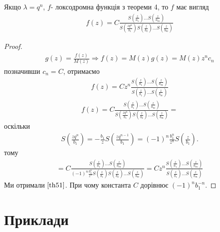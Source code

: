 \documentclass[12pt,a4paper]{article}
\begin{document}
\vspace{1,5cm}

\begin{thm}
Якщо $\lambda =q^{n}$, $f$- локсодромна функція з теореми 4, то  $f$ має вигляд
\begin{equation}\label{th51}
\begin{array}{l}
 f(z)= C\tfrac{S(\frac{z}{a_{1}})...S(\frac{z}{a_{m}})}{S(\frac{zq^{n}}{b_{1}})S(\frac{z}{b_{2}})...S(\frac{z}{b_{m}})}
\end{array}
\end{equation}
 \end{thm}
\begin{proof}
\[\begin{array}{l}
g(z)=\frac{f(z)}{M(z)}\Rightarrow f(z)=M(z)g(z)= M(z)z^{n}c_{n}
 \end{array}\]
 позначивши $c_{n}=C$, отримаємо 
\[\begin{array}{l} 
f(z) =Cz^{n}\frac{S(\frac{z}{a_{1}})...S(\frac{z}{a_{m}})}{S(\frac{z}{b_{1}})...S(\frac{z}{b_{m}})} 
\end{array}\]
\[\begin{array}{l}
f(z)=C\tfrac{S(\frac{z}{a_{1}})...S(\frac{z}{a_{m}})}{S(\frac{zq^{n}}{b_{1}})S(\frac{z}{b_{2}})...S(\frac{z}{b_{m}})}= 
 \end{array}\]
оскільки
\[\begin{array}{l}
S(\frac{zq^{n}}{b_{1}})= -\frac{b_{1}}{z}S(\frac{zq^{n-1}}{b_{1}})=(-1)^{n}\frac{b_{1}^{n}}{z^{n}}S(\frac{z}{b_{1}}).
 \end{array}\]
тому
\[\begin{array}{l}
 =C\tfrac{S(\frac{z}{a_{1}})...S(\frac{z}{a_{m}})}{(-1)^{n}\frac{b_{1}^{n}}{z^{n}} S(\frac{z}{b_{1}})S(\frac{z}{b_{2}})...S(\frac{z}{b_{m}})}=Cz^{n}\frac{S(\frac{z}{a_{1}})...S(\frac{z}{a_{m}})}{S(\frac{z}{b_{1}})...S(\frac{z}{b_{m}})} 
  \end{array}\]
Ми отримали $\eqref{th51}$. При чому константа $C$ дорівнює $(-1)^{n}b_{1}^{-n}$.
\end{proof}


\clearpage
\section{Приклади}
\end{document}
